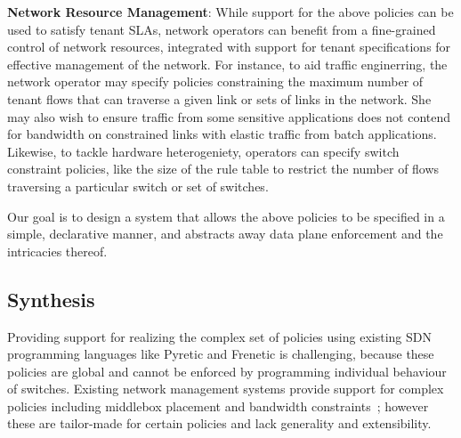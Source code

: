 \textbf{Network Resource Management}: While support for the above
policies can be used to satisfy tenant SLAs, network operators can
benefit from a fine-grained control of network resources, integrated
with support for tenant specifications for effective management of the
network. For instance, to aid traffic enginerring, the network
operator may specify policies constraining the maximum number of
tenant flows that can traverse a given link or sets of links in the
network. She may also wish to ensure traffic from some sensitive
applications does not contend for bandwidth on constrained links with
elastic traffic from batch applications.
  Likewise, to tackle hardware heterogeniety, operators can specify
  switch constraint policies, like the size of the rule table to
  restrict the number of flows traversing a particular switch or set
  of switches.

  Our goal is to design a system that allows the above policies to be
  specified in a simple, declarative manner, and abstracts away 
  data plane enforcement and the intricacies thereof.
  
\subsection{Synthesis} \label{sec:synthesis} 




Providing support for realizing the complex set of policies using
existing SDN programming languages like Pyretic and Frenetic is
challenging, because these policies are global and cannot be enforced
by programming individual behaviour of switches. Existing network
management systems provide support for complex policies including
middlebox placement and bandwidth constraints~\cite{}; however these
are tailor-made for certain policies and lack generality and
extensibility.

